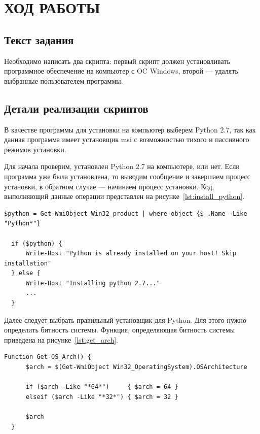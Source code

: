\section{ХОД РАБОТЫ}

\subsection{Текст задания}

Необходимо написать два скрипта: первый скрипт должен установливать
программное обеспечение на компьютер с OC Windows, второй --- удалять
выбранные пользователем программы.

\subsection{Детали реализации скриптов}

В качестве программы для установки на компьютер выберем Python 2.7,
так как данная программа имеет установщик msi с возможностью
тихого и пассивного режимов установки.

Для начала проверим, установлен Python 2.7 на компьютере, или нет. Если
программа уже была установлена, то выводим сообщение и завершаем процесс
установки, в обратном случае --- начинаем процесс установки. Код, выполняющий
данные операции представлен на рисунке~\ref{lst:install_python}.

\begin{lstlisting}[caption=Проверка на существование Python 2.7 в системе,
label=lst:install_python,basicstyle=\scriptsize\ttfamily]
  $python = Get-WmiObject Win32_product | where-object {$_.Name -Like "Python*"}

  if ($python) {
      Write-Host "Python is already installed on your host! Skip installation"
  } else {
      Write-Host "Installing python 2.7..."
      ...
  }
\end{lstlisting}

Далее следует выбрать правильный установщик для Python. Для этого нужно
определить битность системы. Функция, определяющая битность системы
приведена на рисунке~\ref{lst:get_arch}.

\begin{lstlisting}[caption=Определение битности системы,
label=lst:get_arch,basicstyle=\scriptsize\ttfamily]
  Function Get-OS_Arch() {
      $arch = $(Get-WmiObject Win32_OperatingSystem).OSArchitecture

      if ($arch -Like "*64*")     { $arch = 64 }
      elseif ($arch -Like "*32*") { $arch = 32 }

      $arch
  }
\end{lstlisting}

